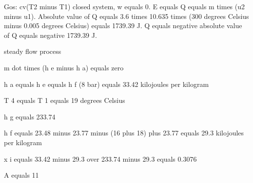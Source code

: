 Gos: cv(T2 minus T1) closed system, w equals 0.  
E equals Q equals m times (u2 minus u1).  
Absolute value of Q equals 3.6 times 10.635 times (300 degrees Celsius minus 0.005 degrees Celsius) equals 1739.39 J.  
Q equals negative absolute value of Q equals negative 1739.39 J.

steady flow process

m dot times (h e minus h a) equals zero

h a equals h e equals h f (8 bar) equals 33.42 kilojoules per kilogram

T 4 equals T 1 equals 19 degrees Celsius

h g equals 233.74

h f equals 23.48 minus 23.77 minus (16 plus 18) plus 23.77 equals 29.3 kilojoules per kilogram

x i equals 33.42 minus 29.3 over 233.74 minus 29.3 equals 0.3076

A equals 11